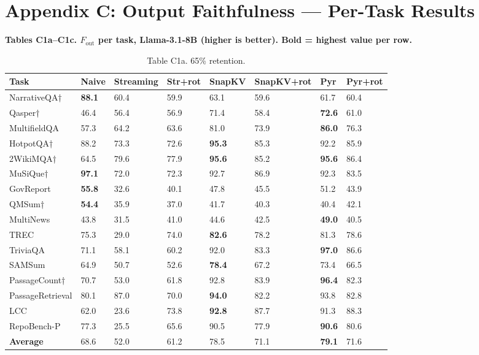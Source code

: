 \documentclass[10pt,letterpaper]{article}
\begin{document}
\clearpage
\hypertarget{appendix-c-output-faithfulness-per-task-results}{%
\section{Appendix C: Output Faithfulness --- Per-Task
Results}\label{appendix-c-output-faithfulness-per-task-results}}

\textbf{Tables C1a--C1c. \(F_{\text{out}}\) per task, Llama-3.1-8B
(higher is better). Bold = highest value per row.}

\begin{table}[H]
\centering
\small
\caption*{Table C1a. 65\% retention.}
\begin{tabular}{@{}llllllll@{}}
\toprule
Task & Naive & Streaming & Str+rot & SnapKV & SnapKV+rot & Pyr &
Pyr+rot\\
\midrule
    NarrativeQA† & \textbf{88.1} & 60.4 & 59.9 & 63.1 & 59.6 & 61.7 & 60.4\\
    Qasper† & 46.4 & 56.4 & 56.9 & 71.4 & 58.4 & \textbf{72.6} & 61.0\\
    MultifieldQA & 57.3 & 64.2 & 63.6 & 81.0 & 73.9 & \textbf{86.0} & 76.3\\
    HotpotQA† & 88.2 & 73.3 & 72.6 & \textbf{95.3} & 85.3 & 92.2 & 85.9\\
    2WikiMQA† & 64.5 & 79.6 & 77.9 & \textbf{95.6} & 85.2 & \textbf{95.6} & 86.4\\
    MuSiQue† & \textbf{97.1} & 72.0 & 72.3 & 92.7 & 86.9 & 92.3 & 83.5\\
    GovReport & \textbf{55.8} & 32.6 & 40.1 & 47.8 & 45.5 & 51.2 & 43.9\\
    QMSum† & \textbf{54.4} & 35.9 & 37.0 & 41.7 & 40.3 & 40.4 & 42.1\\
    MultiNews & 43.8 & 31.5 & 41.0 & 44.6 & 42.5 & \textbf{49.0} & 40.5\\
    TREC & 75.3 & 29.0 & 74.0 & \textbf{82.6} & 78.2 & 81.3 & 78.6\\
    TriviaQA & 71.1 & 58.1 & 60.2 & 92.0 & 83.3 & \textbf{97.0} & 86.6\\
    SAMSum & 64.9 & 50.7 & 52.6 & \textbf{78.4} & 67.2 & 73.4 & 66.5\\
    PassageCount† & 70.7 & 53.0 & 61.8 & 92.8 & 83.9 & \textbf{96.4} & 82.3\\
    PassageRetrieval & 80.1 & 87.0 & 70.0 & \textbf{94.0} & 82.2 & 93.8 & 82.8\\
    LCC & 62.0 & 23.6 & 73.8 & \textbf{92.8} & 87.7 & 91.3 & 88.3\\
    RepoBench-P & 77.3 & 25.5 & 65.6 & 90.5 & 77.9 & \textbf{90.6} & 80.6\\
    \textbf{Average} & 68.6 & 52.0 & 61.2 & 78.5 & 71.1 & \textbf{79.1} & 71.6\\
\bottomrule
\end{tabular}
\end{table}
\end{document}
